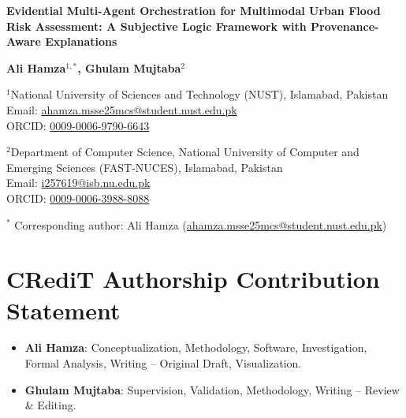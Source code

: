 \documentclass[11pt,a4paper]{article}
\begin{document}
\thispagestyle{empty}

\begin{center}
{\LARGE \bf Evidential Multi-Agent Orchestration for Multimodal Urban Flood Risk Assessment: A Subjective Logic Framework with Provenance-Aware Explanations \par}

\vspace{2em}

{\large \textbf{Ali Hamza$^{1,*}$, Ghulam Mujtaba$^2$} \par}

\vspace{1.5em}

$^1$National University of Sciences and Technology (NUST), Islamabad, Pakistan \\
Email: \href{mailto:ahamza.msse25mcs@student.nust.edu.pk}{ahamza.msse25mcs@student.nust.edu.pk} \\
ORCID: \href{https://orcid.org/0009-0006-9790-6643}{0009-0006-9790-6643}

\vspace{1em}

$^2$Department of Computer Science, National University of Computer and Emerging Sciences (FAST-NUCES), Islamabad, Pakistan \\
Email: \href{mailto:i257619@isb.nu.edu.pk}{i257619@isb.nu.edu.pk} \\
ORCID: \href{https://orcid.org/0009-0006-3988-8088}{0009-0006-3988-8088}

\vspace{1.5em}

$^*$ Corresponding author: Ali Hamza (\href{mailto:ahamza.msse25mcs@student.nust.edu.pk}{ahamza.msse25mcs@student.nust.edu.pk})
\end{center}

\vspace{2em}

\section*{CRediT Authorship Contribution Statement}
\begin{itemize}
    \item \textbf{Ali Hamza}: Conceptualization, Methodology, Software, Investigation, Formal Analysis, Writing -- Original Draft, Visualization.
    \item \textbf{Ghulam Mujtaba}: Supervision, Validation, Methodology, Writing -- Review \& Editing.
\end{itemize}
\end{document}
